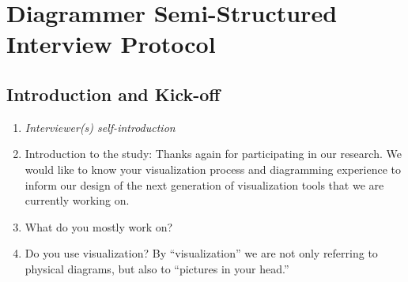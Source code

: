 \chapter{Diagrammer Semi-Structured Interview Protocol}
\label{app:interview-protocol}

\section{Introduction and Kick-off}
\begin{enumerate}
    \item \textit{Interviewer(s) self-introduction}
    \item Introduction to the study: Thanks again for participating in our research. We would like to know your visualization process and diagramming experience to inform our design of the next generation of visualization tools that we are currently working on.
    \item What do you mostly work on?
    \item Do you use visualization? By “visualization” we are not only referring to physical diagrams, but also to “pictures in your head.”
\end{enumerate}

